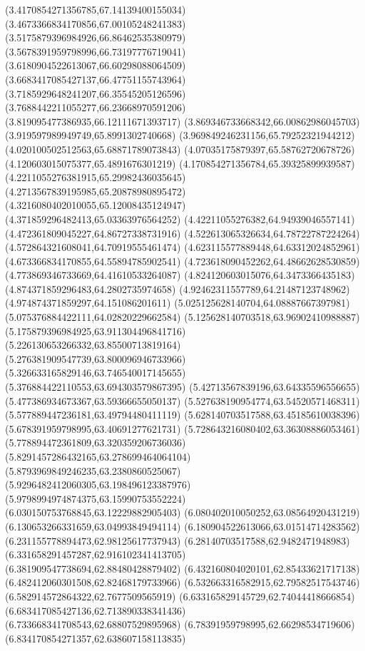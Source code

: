 {(3.4170854271356785,67.14139400155034)
(3.4673366834170856,67.00105248241383)
(3.5175879396984926,66.86462535380979)
(3.5678391959798996,66.73197776719041)
(3.6180904522613067,66.60298088064509)
(3.6683417085427137,66.47751155743964)
(3.7185929648241207,66.35545205126596)
(3.7688442211055277,66.23668970591206)
(3.819095477386935,66.12111671393717)
(3.869346733668342,66.00862986045703)
(3.919597989949749,65.8991302740668)
(3.969849246231156,65.79252321944212)
(4.020100502512563,65.68871789073843)
(4.07035175879397,65.58762720678726)
(4.120603015075377,65.4891676301219)
(4.170854271356784,65.39325899939587)
(4.2211055276381915,65.29982436035645)
(4.2713567839195985,65.20878980895472)
(4.3216080402010055,65.12008435124947)
(4.371859296482413,65.03363976564252)
(4.42211055276382,64.94939046557141)
(4.472361809045227,64.86727338731916)
(4.522613065326634,64.78722787224264)
(4.572864321608041,64.70919555461474)
(4.623115577889448,64.63312024852961)
(4.673366834170855,64.55894785902541)
(4.723618090452262,64.48662628530859)
(4.773869346733669,64.41610533264087)
(4.824120603015076,64.3473366435183)
(4.874371859296483,64.2802735974658)
(4.92462311557789,64.21487123748962)
(4.974874371859297,64.151086201611)
(5.025125628140704,64.08887667397981)
(5.075376884422111,64.02820229662584)
(5.125628140703518,63.96902410988887)
(5.175879396984925,63.911304496841716)
(5.226130653266332,63.85500713819164)
(5.276381909547739,63.800096946733966)
(5.326633165829146,63.746540017145655)
(5.376884422110553,63.694303579867395)
(5.42713567839196,63.64335596556655)
(5.477386934673367,63.59366655050137)
(5.527638190954774,63.54520571468311)
(5.577889447236181,63.49794480411119)
(5.628140703517588,63.45185610038396)
(5.678391959798995,63.40691277621731)
(5.728643216080402,63.36308886053461)
(5.778894472361809,63.320359206736036)
(5.8291457286432165,63.278699464064104)
(5.8793969849246235,63.2380860525067)
(5.9296482412060305,63.198496123387976)
(5.9798994974874375,63.15990753552224)
(6.030150753768845,63.12229882905403)
(6.080402010050252,63.08564920431219)
(6.130653266331659,63.04993849494114)
(6.180904522613066,63.01514714283562)
(6.231155778894473,62.98125617737943)
(6.28140703517588,62.9482471948983)
(6.331658291457287,62.916102341413705)
(6.381909547738694,62.88480428879402)
(6.432160804020101,62.85433621717138)
(6.482412060301508,62.82468179733966)
(6.532663316582915,62.79582517543746)
(6.582914572864322,62.7677509565919)
(6.633165829145729,62.74044418666854)
(6.683417085427136,62.713890338341436)
(6.733668341708543,62.68807529895968)
(6.78391959798995,62.66298534719606)
(6.834170854271357,62.638607158113835)
}
